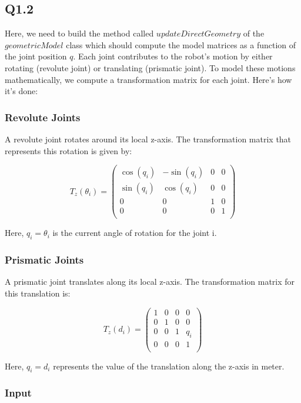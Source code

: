 \subsection{Q1.2}

Here, we need to build the method called $updateDirectGeometry$ of the $geometricModel$ class which should compute the model matrices as a function of the joint position $q$. Each joint contributes to the robot's motion by either rotating (revolute joint) or translating (prismatic joint). To model these motions mathematically, we compute a transformation matrix for each joint. Here's how it's done:

\subsubsection{Revolute Joints}  

A revolute joint rotates around its local z-axis. The transformation matrix that represents this rotation is given by:

\[
T_z(\theta_i) = 
\begin{pmatrix}
\cos(q_i) & -\sin(q_i) & 0 & 0 \\
\sin(q_i) & \cos(q_i) & 0 & 0 \\
0 & 0 & 1 & 0 \\
0 & 0 & 0 & 1 \\
\end{pmatrix}
\]

Here, \( q_i=\theta_i \) is the current angle of rotation for the joint i.

\subsubsection{Prismatic Joints}

A prismatic joint translates along its local z-axis. The transformation matrix for this translation is:

\[
T_z(d_i) =
\begin{pmatrix}
1 & 0 & 0 & 0 \\
0 & 1 & 0 & 0 \\
0 & 0 & 1 & q_i \\
0 & 0 & 0 & 1 \\
\end{pmatrix}
\]

Here, \( q_i = d_i \) represents the value of the translation along the z-axis in meter.

\subsubsection{Input}

